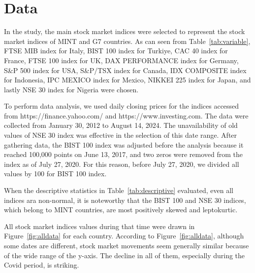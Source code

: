 \section{Data}
\label{sec:data}
In the study, the main stock market indices were selected to represent the stock market indices of MINT and G7 countries. As can seen from Table~\ref{tab:variable}, FTSE MIB index for Italy, BIST 100 index for Turkiye, CAC 40 index for France, FTSE 100 index for UK, DAX PERFORMANCE index for Germany, S\&P 500 index for USA, S\&P/TSX index for Canada, IDX COMPOSITE index for Indonesia, IPC MEXICO index for Mexico, NIKKEI 225 index for Japan, and lastly NSE 30 index for Nigeria were chosen.  

To perform data analysis, we used daily closing prices for the indices accessed from https://finance.yahoo.com/ and https://www.investing.com. The data were collected from January 30, 2012 to August 14, 2024. The unavailability of old values of NSE 30 index was effective in the selection of this date range. After gathering data, the BIST 100 index was adjusted before the analysis because it reached 100,000 points on June 13, 2017, and two zeros were removed from the index as of July 27, 2020. For this reason, before July 27, 2020, we divided all values by 100 for BIST 100 index. 

When the descriptive statistics in Table~\ref{tab:descriptive} evaluated, even all indices ara non-normal, it is noteworthy that the BIST 100 and NSE 30 indices, which belong to MINT countries, are most positively skewed and leptokurtic.

All stock market indices values during that time were drawn in Figure~\ref{fig:alldata} for each country. According to Figure~\ref{fig:alldata}, although some dates are different, stock market movements seem generally similar because of the wide range of the y-axis. The decline in all of them, especially during the Covid period, is striking.

